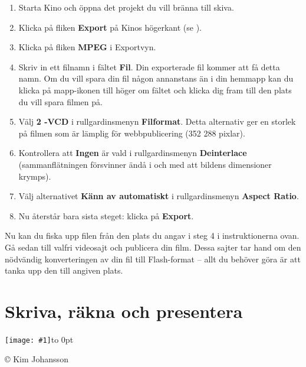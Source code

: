 \documentclass[a4paper,final]{memoir} %
\newcommand{\xrcredit}[1]{\hbox to 0pt{\hspace*{.6\baselineskip}\begin{rotate}{90}{\usefont{T1}{phv}{m}{n}\selectfont\tiny #1}\end{rotate}}}
\newcommand\xintropic[1]{{\texttt{[image: \#1]}\xrcredit{\copyright{} Kim Johansson}}\medskip}
\newcommand\xchapter[2]{\chapter{#2}\begin{center}\xintropic{#1}\end{center}}
\begin{document}
\begin{enumerate}

\item Starta Kino och öppna det projekt du vill bränna till skiva. 

\item Klicka på fliken \textbf{Export} på Kinos högerkant (se ).	

\item Klicka på fliken \textbf{MPEG} i Exportvyn.

\item Skriv in ett filnamn i fältet \textbf{Fil}. Din exporterade fil kommer att få detta namn. Om du vill spara din fil någon annanstans än i din hemmapp kan du klicka på mapp-ikonen till höger om fältet och klicka dig fram till den plats du vill spara filmen på.

\item Välj \textbf{2 -VCD} i rullgardinsmenyn \textbf{Filformat}. Detta alternativ ger en storlek på filmen som är lämplig för webbpublicering (352 \texttimes{} 288 pixlar).

\item Kontrollera att \textbf{Ingen} är vald i rullgardinsmenyn \textbf{Deinterlace} (sammanflätningen försvinner ändå i och med att bildens dimensioner krymps).

\item Välj alternativet \textbf{Känn av automatiskt} i rullgardinsmenyn \textbf{Aspect Ratio}.

\item Nu återstår bara sista steget: klicka på \textbf{Export}. 

\end{enumerate}

Nu kan du fiska upp filen från den plats du angav i steg 4 i instruktionerna ovan. Gå sedan till valfri videosajt och publicera din film. Dessa sajter tar hand om den nödvändig konverteringen av din fil till Flash-format -- allt du behöver göra är att tanka upp den till angiven plats.


\xchapter{bilder804-all/SKriva_Rakna_Presentera}{Skriva, räkna och presentera}\label{cha:kontor}

\end{document}

